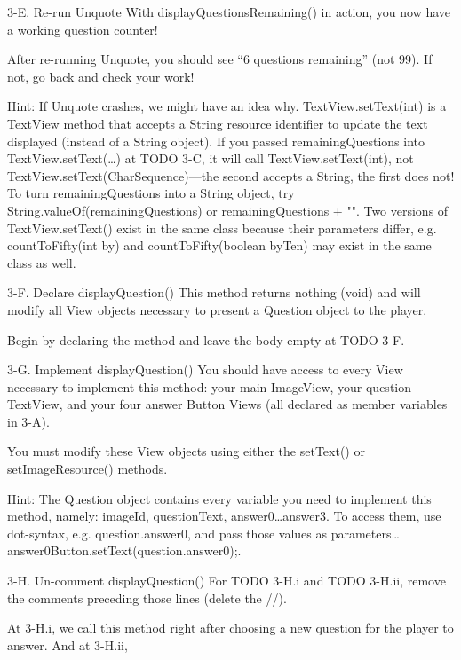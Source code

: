         3-E. Re-run Unquote
                With displayQuestionsRemaining() in action, you now have a working question counter!

                After re-running Unquote, you should see “6 questions remaining” (not 99). If not, go back and check your work!

                        Hint: If Unquote crashes, we might have an idea why.
                        TextView.setText(int) is a TextView method that accepts a String resource identifier to update the text displayed (instead of a String object).
                        If you passed remainingQuestions into TextView.setText(…) at TODO 3-C, it will call TextView.setText(int), not TextView.setText(CharSequence)—the second accepts a String, the first does not!
                        To turn remainingQuestions into a String object, try String.valueOf(remainingQuestions) or remainingQuestions + "".
                        Two versions of TextView.setText() exist in the same class because their parameters differ, e.g. countToFifty(int by) and countToFifty(boolean byTen) may exist in the same class as well.

        3-F. Declare displayQuestion()
                This method returns nothing (void) and will modify all View objects necessary to present a Question object to the player.

                Begin by declaring the method and leave the body empty at TODO 3-F.

        3-G. Implement displayQuestion()
                You should have access to every View necessary to implement this method: your main ImageView, your question TextView, and your four answer Button Views (all declared as member variables in 3-A).

                You must modify these View objects using either the setText() or setImageResource() methods.

                        Hint: The Question object contains every variable you need to implement this method, namely: imageId, questionText, answer0…answer3.
                        To access them, use dot-syntax, e.g. question.answer0, and pass those values as parameters… answer0Button.setText(question.answer0);.

        3-H. Un-comment displayQuestion()
                For TODO 3-H.i and TODO 3-H.ii, remove the comments preceding those lines (delete the //).

                At 3-H.i, we call this method right after choosing a new question for the player to answer. And at 3-H.ii,

